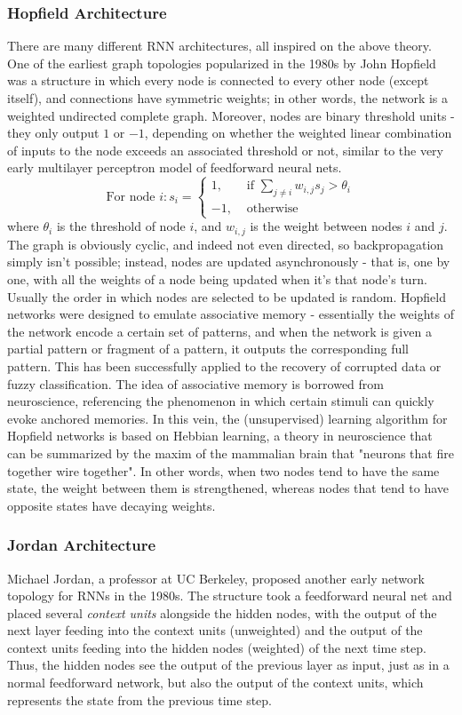 \documentclass{article}
\begin{document}
\subsubsection{Hopfield Architecture}
There are many different RNN architectures, all inspired on the above theory. One of the earliest graph topologies popularized in the 1980s by John Hopfield was a structure in which every node is connected to every other node (except itself), and connections have symmetric weights; in other words, the network is a weighted undirected complete graph. Moreover, nodes are binary threshold units - they only output $ 1 $ or $ -1 $, depending on whether the weighted linear combination of inputs to the node exceeds an associated threshold or not, similar to the very early multilayer perceptron model of feedforward neural nets.
$$ \text{For node } i: s_i = \begin{cases}
    1, &\text{ if } \sum_{j \neq i} w_{i, j} s_j > \theta_i \\
    -1, &\text{ otherwise }
\end{cases} $$
where $ \theta_i $ is the threshold of node $ i $, and $ w_{i, j} $ is the weight between nodes $ i $ and $ j $. The graph is obviously cyclic, and indeed not even directed, so backpropagation simply isn't possible; instead, nodes are updated asynchronously - that is, one by one, with all the weights of a node being updated when it's that node's turn. Usually the order in which nodes are selected to be updated is random.
\newline
Hopfield networks were designed to emulate associative memory - essentially the weights of the network encode a certain set of patterns, and when the network is given a partial pattern or fragment of a pattern, it outputs the corresponding full pattern. This has been successfully applied to the recovery of corrupted data or fuzzy classification. The idea of associative memory is borrowed from neuroscience, referencing the phenomenon in which certain stimuli can quickly evoke anchored memories. In this vein, the (unsupervised) learning algorithm for Hopfield networks is based on Hebbian learning, a theory in neuroscience that can be summarized by the maxim of the mammalian brain that "neurons that fire together wire together". In other words, when two nodes tend to have the same state, the weight between them is strengthened, whereas nodes that tend to have opposite states have decaying weights.

\subsubsection{Jordan Architecture}
Michael Jordan, a professor at UC Berkeley, proposed another early network topology for RNNs in the 1980s. The structure took a feedforward neural net and placed several \textit{context units} alongside the hidden nodes, with the output of the next layer feeding into the context units (unweighted) and the output of the context units feeding into the hidden nodes (weighted) of the next time step. Thus, the hidden nodes see the output of the previous layer as input, just as in a normal feedforward network, but also the output of the context units, which represents the state from the previous time step. 
\end{document}
